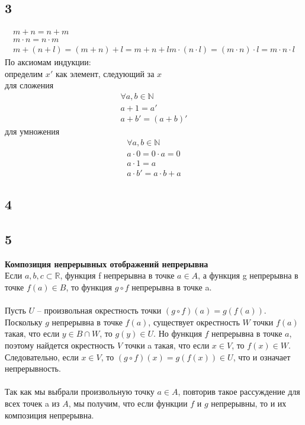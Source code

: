		
		\subsection{3}
		\begin{gather*}
		m + n = n + m\\
		m \cdot n = n \cdot m\\
		m + (n + l) = (m + n) + l = m + n + l
		m \cdot (n \cdot l) = (m \cdot n) \cdot l = m \cdot n \cdot l
		\end{gather*}
		По аксиомам индукции:\\
		определим $x'$ как элемент, следующий за $x$\\
		для сложения 
		\begin{gather*}
			\forall a,b \in \mathbb{N}\\
			a + 1 = a'\\
			a + b' = (a + b)'
		\end{gather*}
		для умножения
		\begin{gather*}
			\forall a,b \in \mathbb{N}\\
			a \cdot 0 = 0 \cdot a = 0\\
			a \cdot 1 = a\\
			a \cdot b' = a \cdot b + a
		\end{gather*}
		
		\subsection{4}
		
		\subsection{5}
		\textbf{Композиция непрерывных отображений непрерывна}
		\\
		Если $a, b, c \subset \mathbb{R}$, функция f непрерывна в точке $a \in A$, а функция g непрерывна в точке $f(a) \in B$, то функция $g \circ f$ непрерывна в точке a.\\
		\\
		Пусть $U$ -- произвольная окрестность точки $(g \circ f)(a) = g(f(a))$. Поскольку $g$ непрерывна в точке $f(a)$, существует окрестность $W$ точки $f(a)$ такая, что если $y \in B \cap W$, то $g(y) \in U$. Но функция $f$ непрерывна в точке $a$, поэтому найдется окрестность $V$ точки a такая, что если $x \in V$, то $f(x) \in W$. Следовательно, если $x \in V$, то $(g \circ f)(x) = g(f(x)) \in U$, что и означает непрерывность.\\
		\\
		Так как мы выбрали произвольную точку $a \in A$, повторив такое рассуждение для всех точек a из $A$, мы получим, что если функции $f$ и $g$ непрерывны, то и их композиция непрерывна. 
		
